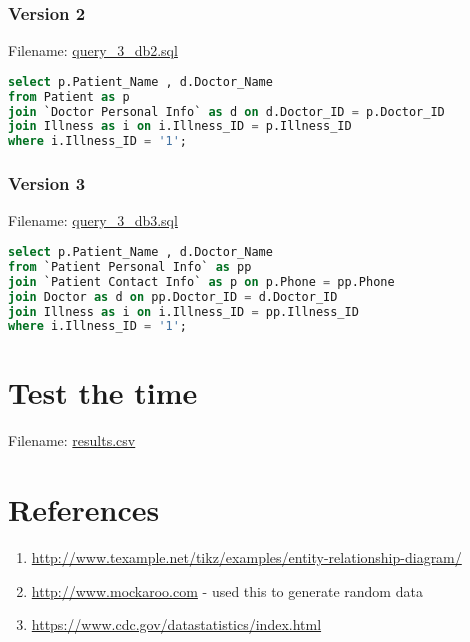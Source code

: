 \documentclass[12pt,arial]{article}
\begin{document}
\subsubsection{Version 2}
Filename: \url{query_3_db2.sql}
\begin{lstlisting}[language=SQL]
select p.Patient_Name , d.Doctor_Name
from Patient as p
join `Doctor Personal Info` as d on d.Doctor_ID = p.Doctor_ID
join Illness as i on i.Illness_ID = p.Illness_ID
where i.Illness_ID = '1';
\end{lstlisting}
\subsubsection{Version 3}
Filename: \url{query_3_db3.sql}
\begin{lstlisting}[language=SQL]
select p.Patient_Name , d.Doctor_Name
from `Patient Personal Info` as pp
join `Patient Contact Info` as p on p.Phone = pp.Phone
join Doctor as d on pp.Doctor_ID = d.Doctor_ID
join Illness as i on i.Illness_ID = pp.Illness_ID
where i.Illness_ID = '1';
\end{lstlisting}
\section{Test the time}
Filename: \url{results.csv}
\section{References} 
\begin{enumerate}
	\item \url{http://www.texample.net/tikz/examples/entity-relationship-diagram/}
	\item \url{http://www.mockaroo.com} - used this to generate random data
	\item \url{https://www.cdc.gov/datastatistics/index.html}
\end{enumerate}
\end{document}
